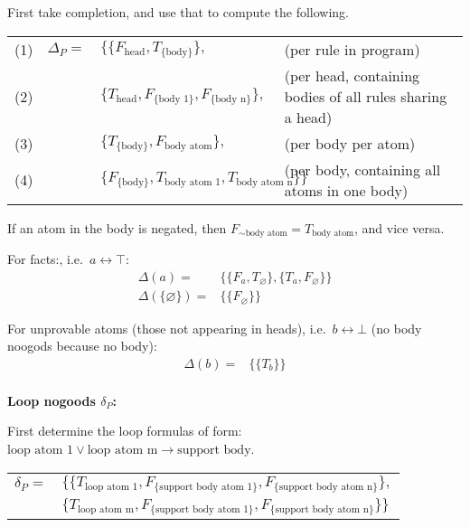 \documentclass[9pt,a4paper,landscape]{article}
\newcommand{\ngtb}[1]{T_{ \{#1\} }}
\newcommand{\ngfb}[1]{F_{ \{#1\} }}
\newcommand{\ngta}[1]{T_{#1}}
\newcommand{\ngfa}[1]{F_{#1}}
\begin{document}
{First take completion, and use that to compute the following.

\begin{center}
	\begin{tabular}{lrll}
	(1) & $\Delta_P =$ 	& $\{ \{ \ngfa{\text{head}}, \ngtb{\text{body}} \},$ & (per rule in program) \\
	(2) &				& $\{ \ngta{\text{head}}, \ngfb{\text{body 1}}, \ngfb{\text{body n}} \},$ & (per head, containing bodies of all rules sharing a head) \\
	(3) &				& $\{ \ngtb{\text{body}}, \ngfa{\text{body atom}} \},$ & (per body per atom)\\
	(4) &				& $\{ \ngfb{\text{body}}, \ngta{\text{body atom 1}}, \ngta{\text{body atom n}} \} \}$ & (per body, containing all atoms in one body)
\end{tabular}
\end{center}

If an atom in the body is negated, then $\ngfa{{\sim} \text{body atom}} = \ngta{\text{body atom}}$, and vice versa.

For facts:, i.e.\ $a \leftrightarrow \top$:
\begin{align*}
\Delta (a) = & \{ \{ \ngfa{a}, \ngta{\varnothing} \}, \{ \ngta{a}, \ngfa{\varnothing} \} \} \\
\Delta (\{\varnothing\}) = & \{ \{ \ngfa{\varnothing} \} \}
\end{align*}

For unprovable atoms (those not appearing in heads), i.e.\ $b \leftrightarrow \bot$ (no body noogods because no body):
\begin{align*}
\Delta (b) = & \{ \{ \ngta{b} \} \} \\
\end{align*}

\vspace{\baselineskip}
\textbf{Loop nogoods $\delta_P$:}
 
First determine the loop formulas of form: $\text{loop atom 1} \lor \text{loop atom m} \rightarrow \text{support body}$.

\begin{center}
	\begin{tabular}{rl}
		$\delta_P =$ 	& $\{ \{ \ngta{\text{loop atom 1}}, \ngfb{\text{support body atom 1}}, \ngfb{\text{support body atom n}} \},$ \\
						& $\{ \ngta{\text{loop atom m}}, \ngfb{\text{support body atom 1}}, \ngfb{\text{support body atom n}} \} \}$ \\
	\end{tabular}
\end{center}

}
\end{document}
